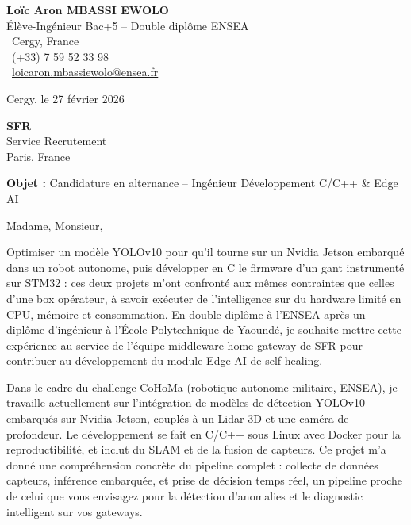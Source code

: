 \documentclass[a4paper,11pt]{article}
\begin{document}
\noindent
\begin{minipage}[t]{0.5\textwidth}
    \textbf{Loïc Aron MBASSI EWOLO}\\
    Élève-Ingénieur Bac+5 -- Double diplôme ENSEA\\[3pt]
    \faMapMarker\ Cergy, France\\
    \faPhone\ (+33) 7 59 52 33 98\\
    \faEnvelope\ \href{mailto:loicaron.mbassiewolo@ensea.fr}{loicaron.mbassiewolo@ensea.fr}
\end{minipage}
\hfill
\begin{minipage}[t]{0.4\textwidth}
    \raggedleft
    Cergy, le 27 février 2026
\end{minipage}

\vspace{1.2cm}

\hfill
\begin{minipage}[t]{0.5\textwidth}
    \raggedleft
    \textbf{SFR}\\
    Service Recrutement\\
    Paris, France
\end{minipage}

\vspace{1cm}

\noindent\textbf{Objet :} Candidature en alternance -- Ingénieur Développement C/C++ \& Edge AI

\vspace{0.8cm}

Madame, Monsieur,

Optimiser un modèle YOLOv10 pour qu'il tourne sur un Nvidia Jetson embarqué dans un robot autonome, puis développer en C le firmware d'un gant instrumenté sur STM32 : ces deux projets m'ont confronté aux mêmes contraintes que celles d'une box opérateur, à savoir exécuter de l'intelligence sur du hardware limité en CPU, mémoire et consommation. En double diplôme à l'ENSEA après un diplôme d'ingénieur à l'École Polytechnique de Yaoundé, je souhaite mettre cette expérience au service de l'équipe middleware home gateway de SFR pour contribuer au développement du module Edge AI de self-healing.

Dans le cadre du challenge CoHoMa (robotique autonome militaire, ENSEA), je travaille actuellement sur l'intégration de modèles de détection YOLOv10 embarqués sur Nvidia Jetson, couplés à un Lidar 3D et une caméra de profondeur. Le développement se fait en C/C++ sous Linux avec Docker pour la reproductibilité, et inclut du SLAM et de la fusion de capteurs. Ce projet m'a donné une compréhension concrète du pipeline complet : collecte de données capteurs, inférence embarquée, et prise de décision temps réel, un pipeline proche de celui que vous envisagez pour la détection d'anomalies et le diagnostic intelligent sur vos gateways.
\end{document}
